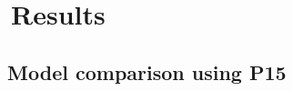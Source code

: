 \graphicspath{{images/}}

\section{\thesection~Results}
\label{sec:results}






\subsection{\thesubsection~Model comparison using P15}
\label{sec:P15_fit}

